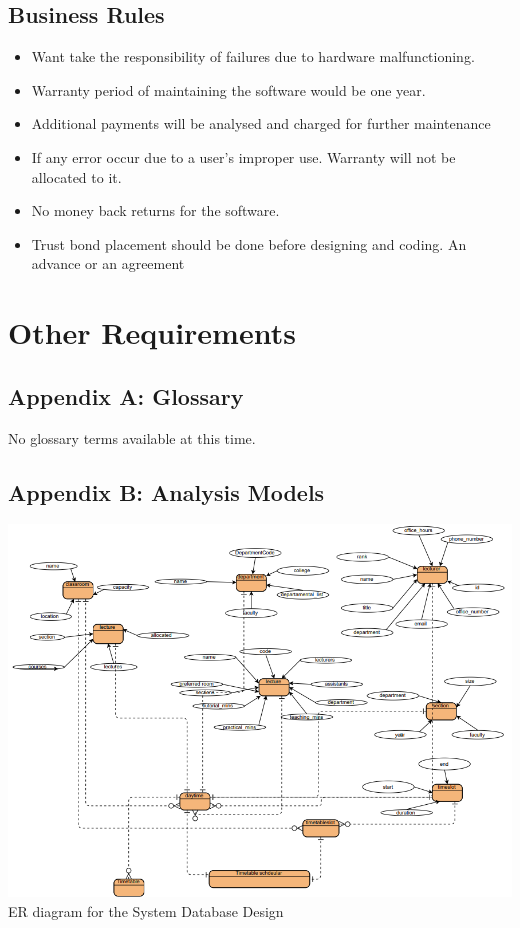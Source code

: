 \documentclass{scrreprt}
\begin{document}
\section{Business Rules}
\begin{itemize}
 \item Want take the responsibility of failures due to hardware malfunctioning.
\item  Warranty period of maintaining the software would be one year.
\item Additional payments will be analysed and charged for further maintenance
\item  If any error occur due to a user’s improper use. Warranty will not be allocated to it.
\item  No money back returns for the software.
\item Trust bond placement should be done before designing and coding. An advance or an
agreement

\end{itemize}

\chapter{Other Requirements}
 
\section{Appendix A: Glossary}
 No glossary terms available at this time.

\section{Appendix B: Analysis Models}
 \begin{center}
\includegraphics[scale=0.6]{er.png}
\centering
ER diagram for the System Database Design
\end{center}
\end{document}
